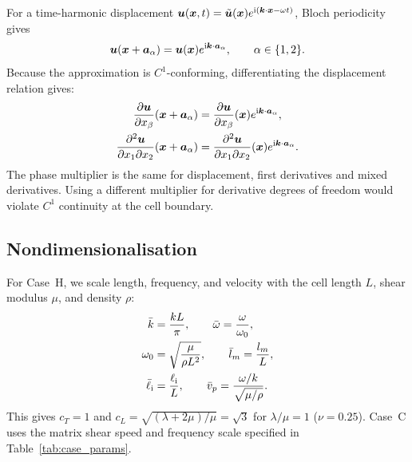 For a time-harmonic displacement $\bm{u}(\bm{x},t)=\tilde{\bm{u}}(\bm{x})e^{\mathrm{i}(\bm{k}\cdot\bm{x}-\omega t)}$, Bloch periodicity gives
\begin{equation}
\bm{u}(\bm{x}+\bm{a}_\alpha)=\bm{u}(\bm{x})e^{\mathrm{i}\bm{k}\cdot\bm{a}_\alpha},\qquad \alpha\in\{1,2\}.
\label{eq:bloch_displacement}
\end{equation}
Because the approximation is $C^1$-conforming, differentiating the displacement relation gives:
\begin{equation}
\begin{split}
\frac{\partial\bm{u}}{\partial x_\beta}(\bm{x}+\bm{a}_\alpha)&=\frac{\partial\bm{u}}{\partial x_\beta}(\bm{x})e^{\mathrm{i}\bm{k}\cdot\bm{a}_\alpha},\\
\frac{\partial^2\bm{u}}{\partial x_1\partial x_2}(\bm{x}+\bm{a}_\alpha)&=\frac{\partial^2\bm{u}}{\partial x_1\partial x_2}(\bm{x})e^{\mathrm{i}\bm{k}\cdot\bm{a}_\alpha}.
\end{split}
\label{eq:bloch_derivatives}
\end{equation}
The phase multiplier is the same for displacement, first derivatives and mixed derivatives. Using a different multiplier for derivative degrees of freedom would violate $C^1$ continuity at the cell boundary.

\subsection{Nondimensionalisation}
For Case~H, we scale length, frequency, and velocity with the cell length $L$, shear modulus $\mu$, and density $\rho$:
\begin{equation}
\begin{split}
\bar{k}&=\frac{kL}{\pi},\qquad \bar{\omega}=\frac{\omega}{\omega_0},\\
\omega_0&=\sqrt{\frac{\mu}{\rho L^2}},\qquad \bar{l}_m=\frac{l_m}{L},\\
\bar{\ell}_{\mathrm{i}}&=\frac{\ell_{\mathrm{i}}}{L},\qquad \bar{v}_p=\frac{\omega/k}{\sqrt{\mu/\rho}}.
\end{split}
\label{eq:nondim_defs}
\end{equation}
This gives $c_T=1$ and $c_L=\sqrt{(\lambda+2\mu)/\mu}=\sqrt{3}$ for $\lambda/\mu=1$ ($\nu=0.25$). Case~C uses the matrix shear speed and frequency scale specified in Table~\ref{tab:case_params}.

\begin{table}[htbp]
\begin{center}
\begin{threeparttable}
\tablebodyfont
\caption{Selected material and numbers for Cases H and C and steering analysis.}
\label{tab:case_params}

\end{threeparttable}
\end{center}
\end{table}


